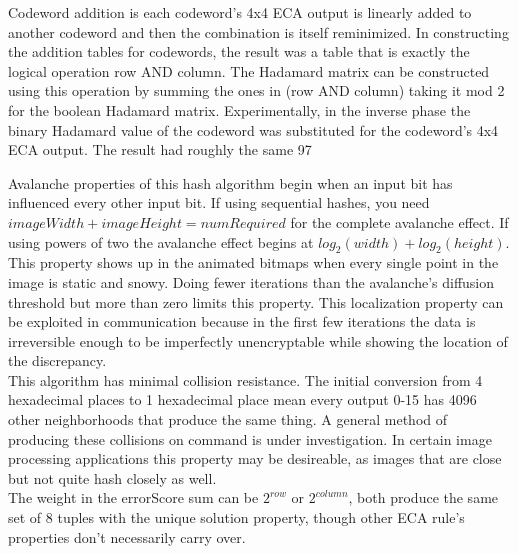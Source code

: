 \documentclass[11pt]{article}
\begin{document}
Codeword addition is each codeword's 4x4 ECA output is linearly added to another codeword and then the combination is itself reminimized. In constructing the addition tables for codewords, the result was a table that is exactly the logical operation row AND column. The Hadamard matrix can be constructed using this operation by summing the ones in (row AND column) taking it mod 2 for the boolean Hadamard matrix. Experimentally, in the inverse phase the binary Hadamard value of the codeword was substituted for the codeword's 4x4 ECA output. The result had roughly the same 97%

Avalanche properties of this hash algorithm begin when an input bit has influenced every other input bit. If using sequential hashes, you need $imageWidth+imageHeight=numRequired$ for the complete avalanche effect. If using powers of two the avalanche effect begins at $log_2 (width) + log_2 (height)$. This property shows up in the animated bitmaps when every single point in the image is static and snowy. Doing fewer iterations than the avalanche's diffusion threshold but more than zero limits this property. This localization property can be exploited in communication because in the first few iterations the data is irreversible enough to be imperfectly unencryptable while showing the location of the discrepancy.\\

This algorithm has minimal collision resistance. The initial conversion from 4 hexadecimal places to 1 hexadecimal place mean every output 0-15 has 4096 other neighborhoods that produce the same thing. A general method of producing these collisions on command is under investigation. In certain image processing applications this property may be desireable, as images that are close but not quite hash closely as well.\\

The weight in the errorScore sum can be $2^{row}$ or $2^{column}$, both produce the same set of 8 tuples with the unique solution property, though other ECA rule's properties don't necessarily carry over.\\
\end{document}
